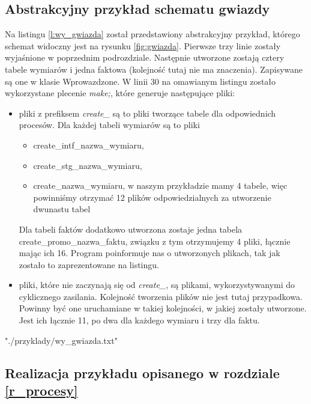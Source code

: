 \subsection{Abstrakcyjny przykład schematu gwiazdy}
Na listingu \ref{l:wy_gwiazda} został przedstawiony abstrakcyjny przykład,
 którego schemat widoczny jest na rysunku \ref{fig:gwiazda}.
Pierwsze trzy linie zostały wyjaśnione w poprzednim podrozdziale.
Następnie utworzone zostają cztery tabele wymiarów i jedna faktowa (kolejność tutaj nie ma znaczenia). 
Zapisywane są one w klasie Wprowazdzone.
W linii 30 na omawianym listingu zostało wykorzystane plecenie \textit{make;},
 które generuje następujące pliki:
 
  \begin{itemize}
   \item 
      pliki z prefiksem \textit{create\_} są to pliki tworzące tabele dla odpowiednich procesów.
      Dla każdej tabeli wymiarów są to pliki 
        \begin{itemize}
         \item  create\_intf\_nazwa\_wymiaru,
         \item  create\_stg\_nazwa\_wymiaru,
         \item  create\_nazwa\_wymiaru,
            w naszym przykładzie mamy 4 tabele, więc powinniśmy otrzymać 12 plików 
            odpowiedzialnych za utworzenie dwunastu tabel
        \end{itemize}
      Dla tabeli faktów dodatkowo utworzona zostaje  jedna tabela create\_promo\_nazwa\_faktu,
      związku z tym otrzymujemy 4 pliki,
      łącznie mając ich 16. Program poinformuje nas o utworzonych plikach,
      tak jak zostało to zaprezentowane na listingu.
   \item 
      pliki, które nie zaczynają się od \textit{create\_},
      są plikami, wykorzystywanymi do cyklicznego zasilania.
     Kolejność tworzenia plików nie jest tutaj przypadkowa.
     Powinny być one uruchamiane w takiej kolejności, w jakiej zostały utworzone.
     Jest ich łącznie 11, po dwa dla każdego wymiaru i trzy dla faktu.
  \end{itemize}


 {"./przyklady/wy_gwiazda.txt"}
\subsection{Realizacja przykładu opisanego w rozdziale \ref{r_procesy}  }

